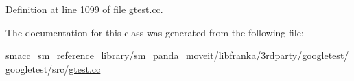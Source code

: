 Definition at line 1099 of file gtest.\+cc.



The documentation for this class was generated from the following file\+:\begin{DoxyCompactItemize}
\item 
smacc\+\_\+sm\+\_\+reference\+\_\+library/sm\+\_\+panda\+\_\+moveit/libfranka/3rdparty/googletest/googletest/src/\hyperlink{gtest_8cc}{gtest.\+cc}\end{DoxyCompactItemize}
